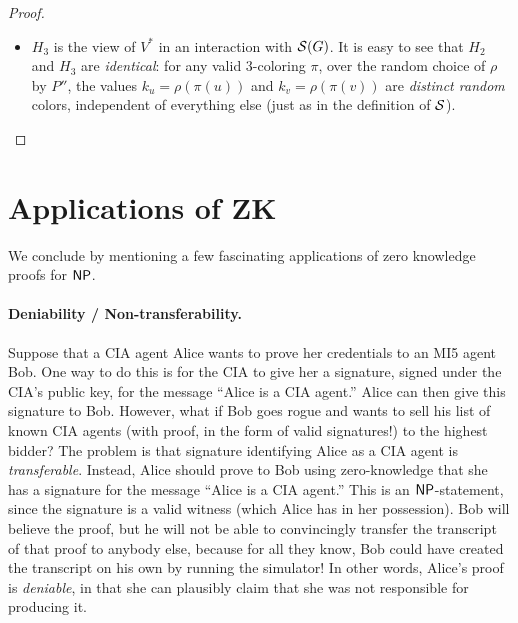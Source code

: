 \documentclass[11pt]{article}
\begin{document}
\begin{proof}
\begin{itemize}
    Using the computational hiding property of the commitment scheme,
    one can show that $H_{1} \compind H_{2}$.  To do this formally, we
    would actually consider a sequence of ``sub-hybrids'' in which one
    color $k_{i}$ at a time is changed from its ``true'' value
    $\rho(\pi(i))$ (as in $H_{1}$) to its ``simulated'' value $1$ (as
    in $H_{2}$).  We remark that the reduction from breaking the
    commitment scheme to distinguishing adjacent sub-hybrids uses
    \emph{non-uniformity} in an essential way, because to simulate the
    entire view of $V^{*}$ (given a commitment to either
    $\rho(\pi(i))$ or $1$), the simulator needs to have $G$ and $\pi$
    ``hard-coded'' into it.  (This is a rather technical point, but is
    an important one for a rigorous proof.)

  \item $H_{3}$ is the view of $V^{*}$ in an interaction with
    $\mathcal{S}(G)$.  It is easy to see that $H_{2}$ and $H_{3}$ are
    \emph{identical}: for any valid $3$-coloring $\pi$, over the
    random choice of $\rho$ by $P''$, the values $k_{u} =
    \rho(\pi(u))$ and $k_{v} = \rho(\pi(v))$ are \emph{distinct
      random} colors, independent of everything else (just as in the
    definition of $\mathcal{S}$).
  \end{itemize}
\end{proof}

\section{Applications of ZK}
\label{sec:applications-zk}

We conclude by mentioning a few fascinating applications of zero
knowledge proofs for $\mathsf{NP}$.

\paragraph{Deniability / Non-transferability.}

Suppose that a CIA agent Alice wants to prove her credentials to an
MI5 agent Bob.  One way to do this is for the CIA to give her a
signature, signed under the CIA's public key, for the message ``Alice
is a CIA agent.''  Alice can then give this signature to Bob.
However, what if Bob goes rogue and wants to sell his list of known
CIA agents (with proof, in the form of valid signatures!) to the
highest bidder?  The problem is that signature identifying Alice as a
CIA agent is \emph{transferable}.  Instead, Alice should prove to Bob
using zero-knowledge that she has a signature for the message ``Alice
is a CIA agent.''  This is an $\mathsf{NP}$-statement, since the signature is
a valid witness (which Alice has in her possession).  Bob will believe
the proof, but he will not be able to convincingly transfer the
transcript of that proof to anybody else, because for all they know,
Bob could have created the transcript on his own by running the
simulator!  In other words, Alice's proof is \emph{deniable}, in that
she can plausibly claim that she was not responsible for producing it.
\end{document}

